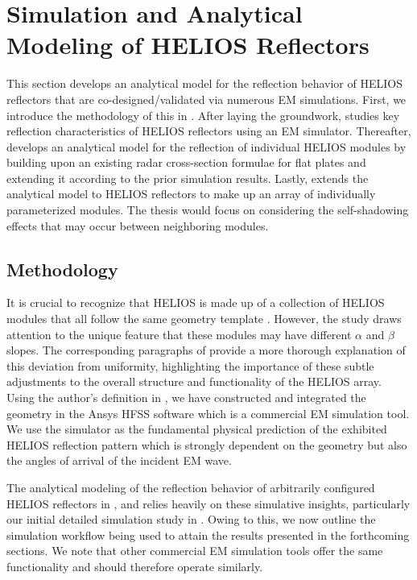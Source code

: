 \chapter{Simulation and Analytical Modeling of HELIOS Reflectors} \label{Simulation and Analytical Modeling of HELIOS Reflectors}
This section develops an analytical model for the reflection behavior of HELIOS reflectors that are co-designed/validated via numerous EM simulations. First, we introduce the methodology of this in . After laying the groundwork,  studies key reflection characteristics of HELIOS reflectors using an EM simulator.  Thereafter,  develops an analytical model for the reflection of individual HELIOS modules by building upon an existing radar cross-section formulae for flat plates and extending it according to the prior simulation results. Lastly,  extends the analytical model to HELIOS reflectors to make up an array of individually parameterized modules. The thesis would focus on considering the self-shadowing effects that may occur between neighboring modules.
\section{Methodology}\label{sec:Simulation Methodology}
It is crucial to recognize that HELIOS is made up of a collection of HELIOS modules that all follow the same geometry template \cite{Helios}. However, the study draws attention to the unique feature that these modules may have different $\alpha$ and $\beta$ slopes. The corresponding paragraphs of  provide a more thorough explanation of this deviation from uniformity, highlighting the importance of these subtle adjustments to the overall structure and functionality of the HELIOS array. Using the author's definition in \cite{Helios}, we have constructed and integrated the geometry in the Ansys HFSS software which is a commercial EM simulation tool. We use the simulator as the fundamental physical prediction of the exhibited HELIOS reflection pattern which is strongly dependent on the geometry but also the angles of arrival of the incident EM wave.

The analytical modeling of the reflection behavior of arbitrarily configured HELIOS reflectors in , and  relies heavily on these simulative insights, particularly our initial detailed simulation study in . Owing to this, we now outline the simulation workflow being used to attain the results presented in the forthcoming sections. We note that other commercial EM simulation tools offer the same functionality and should therefore operate similarly.

